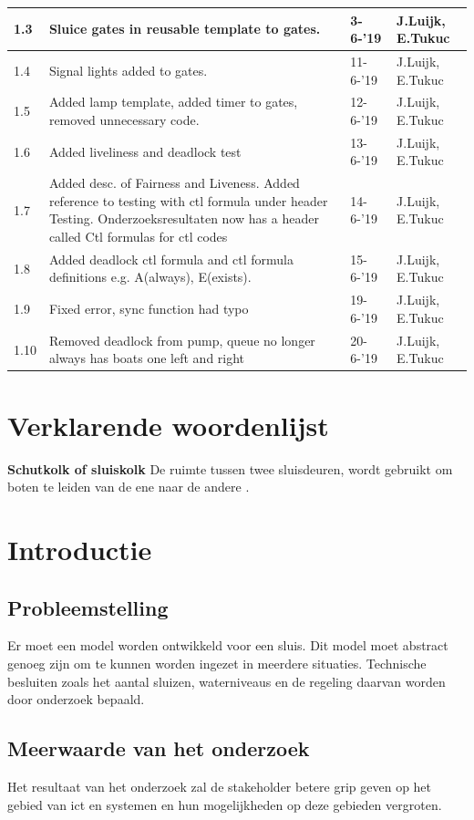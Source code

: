 \documentclass{article}
\begin{document}
\begin{table}[htp]
\begin{tabular}{|l|p{2.5in}|l|l|}
\hline
1.3 & Sluice gates in reusable template to gates. & 3-6-'19 & J.Luijk, E.Tukuc \\ 
\hline
1.4 & Signal lights added to gates. & 11-6-'19 & J.Luijk, E.Tukuc \\ 
\hline
1.5 & Added lamp template, added timer to gates, removed unnecessary code. & 12-6-'19 & J.Luijk, E.Tukuc \\ 
\hline
1.6 & Added liveliness and deadlock test & 13-6-'19 & J.Luijk, E.Tukuc \\ 
\hline
1.7 & Added desc. of Fairness and Liveness. Added reference to testing with ctl formula under header Testing. Onderzoeksresultaten now has a header called Ctl formulas for ctl codes & 14-6-'19 & J.Luijk, E.Tukuc \\ 
\hline
1.8 & Added deadlock ctl formula and ctl formula definitions e.g. A(always), E(exists). & 15-6-'19 & J.Luijk, E.Tukuc \\ 
\hline
1.9 & Fixed error, sync function had typo & 19-6-'19 & J.Luijk, E.Tukuc \\ 
\hline
1.10 & Removed deadlock from pump, queue no longer always has boats one left and right & 20-6-'19 & J.Luijk, E.Tukuc \\ 
\hline
\end{tabular}
\end{table}
\newpage

\section{Verklarende woordenlijst}
\textbf{Schutkolk of sluiskolk} \newline
De ruimte tussen twee sluisdeuren, wordt gebruikt om boten te leiden van de ene naar de andere \cite{definitionschutkolk}.
\newpage
\section{Introductie}
\subsection{Probleemstelling}
Er moet een model worden ontwikkeld voor een sluis. Dit model moet abstract genoeg zijn om te kunnen worden ingezet in meerdere situaties. Technische besluiten zoals het aantal sluizen, waterniveaus en de regeling daarvan worden door onderzoek bepaald.

\subsection{Meerwaarde van het onderzoek}
Het resultaat van het onderzoek zal de stakeholder betere grip geven op het gebied van ict en systemen en hun mogelijkheden op deze gebieden vergroten. 
\end{document}
